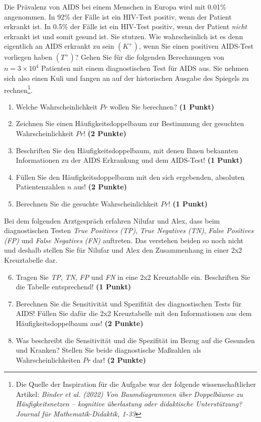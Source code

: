 \documentclass[a4paper, 9pt]{scrartcl}\usepackage[]{graphicx}\usepackage[]{xcolor}
\begin{document}
Die Prävalenz von AIDS bei einem Menschen in Europa wird mit 0.01\% angenommen. In 92\% der Fälle ist ein HIV-Test positiv, wenn der Patient erkrankt ist. In 0.5\% der Fälle ist ein HIV-Test positiv, wenn der Patient \textit{nicht} erkrankt ist und somit gesund ist. Sie stutzen. Wie wahrscheinlich ist es denn eigentlich an AIDS erkrankt zu sein $(K^+)$, wenn Sie einen positiven AIDS-Test vorliegen haben $(T^+)$? Gehen Sie für die folgenden Berechnungen von $n = \ensuremath{3\times 10^{4}}$ Patienten mit einem diagnostischen Test für AIDS aus. Sie nehmen sich also einen Kuli und fangen an auf der historischen Ausgabe des Spiegels zu rechnen\footnote{Die Quelle der Inspiration für die Aufgabe war der folgende wissenschaftlicher Artikel: \textit{Binder et al. (2022) Von Baumdiagrammen über Doppelbäume zu Häufigkeitsnetzen -- kognitive überlastung oder didaktische Unterstützung? Journal für Mathematik-Didaktik, 1-33}}.


\begin{enumerate}
\item Welche Wahrscheinlichkeit $Pr$ wollen Sie berechnen? \textbf{(1 Punkt)}
\item Zeichnen Sie einen Häufigkeitsdoppelbaum zur Bestimmung der gesuchten Wahrscheinlichkeit $Pr$! \textbf{(2 Punkte)} \item Beschriften Sie den Häufigkeitsdoppelbaum, mit denen Ihnen bekannten Informationen zu der AIDS Erkrankung und dem AIDS-Test! \textbf{(1 Punkt)}
\item Füllen Sie den Häufigkeitsdoppelbaum mit den sich ergebenden, absoluten Patientenzahlen $n$ aus! \textbf{(2 Punkte)}
\item Berechnen Sie die gesuchte Wahrscheinlichkeit $Pr$! \textbf{(1 Punkt)}
\end{enumerate}

Bei dem folgenden Arztgespräch erfahren Nilufar und Alex, dass beim diagnostischen Testen \textit{True Positives (TP)}, \textit{True Negatives (TN)}, \textit{False Positives (FP)} und \textit{False Negatives (FN)} auftreten. Das verstehen beiden so noch nicht und deshalb stellen Sie für Nilufar und Alex den Zusammenhang in einer 2x2 Kreuztabelle dar.

\begin{enumerate}
  \setcounter{enumi}{5}
\item Tragen Sie \textit{TP}, \textit{TN}, \textit{FP} und \textit{FN} in eine 2x2 Kreuztablle ein. Beschriften Sie die Tabelle entsprechend! \textbf{(1 Punkt)}
\item Berechnen Sie die Sensitivität und Spezifität des diagnostischen Tests für AIDS! Füllen Sie dafür die 2x2 Kreuztabelle mit den Informationen aus dem Häufigkeitsdoppelbaum aus! \textbf{(2 Punkte)}
\item Was beschreibt die Sensitivität und die Spezifität im Bezug auf die Gesunden und Kranken? Stellen Sie beide diagnostische Maßzahlen als Wahrscheinlichkeiten $Pr$ dar! \textbf{(2 Punkte)} 
\end{enumerate}
\end{document}
